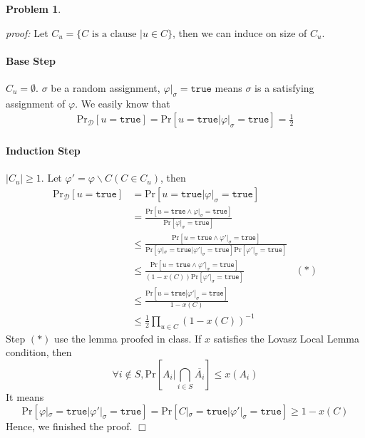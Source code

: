 \documentclass{article}
\newtheorem{problem}[theorem]{Problem}
\newenvironment{solution}{\noindent \textit{proof:}}{$\Box$}
\begin{document}
\begin{problem}
\end{problem}
\begin{solution}
    Let $C_u = \{ C \text{ is a clause } | u \in C \}$, then we can induce on size of $C_u$.
    \paragraph{Base Step} $C_u = \emptyset$. 
    $\sigma$ be a random assignment, 
    $\varphi|_\sigma = \mathtt{true}$ means $\sigma$ is a satisfying assignment of $\varphi$. We easily know that
    \begin{align*}
        \mathrm{Pr}_{\mathcal{D}}[u = \mathtt{true}] 
        = \mathrm{Pr}[u = \mathtt{true}|\varphi|_\sigma = \mathtt{true}] = \frac 1 2
    \end{align*}
    
    \paragraph{Induction Step} $|C_u| \geq 1$. Let $\varphi' = \varphi \backslash C(C \in C_u)$, then
    \begin{align*}
        \mathrm{Pr}_{\mathcal{D}}[u = \mathtt{true}] 
        &= \mathrm{Pr}[u = \mathtt{true}|\varphi|_\sigma = \mathtt{true}] \\
        &= \frac {\mathrm{Pr}[u = \mathtt{true} \land \varphi|_\sigma = \mathtt{true}]} {\mathrm{Pr}[\varphi|_\sigma = \mathtt{true}]} \\
        &\leq \frac {\mathrm{Pr}[u = \mathtt{true} \land \varphi'|_\sigma = \mathtt{true}]} {\mathrm{Pr}[\varphi|_\sigma = \mathtt{true}|\varphi'|_\sigma = \mathtt{true}]\mathrm{Pr}[\varphi'|_\sigma = \mathtt{true}]} \\
        &\leq \frac {\mathrm{Pr}[u = \mathtt{true} \land \varphi'|_\sigma = \mathtt{true}]} {(1-x(C))\mathrm{Pr}[\varphi'|_\sigma = \mathtt{true}]} &(*)\\
        &\leq \frac {\mathrm{Pr}[u = \mathtt{true} | \varphi'|_\sigma = \mathtt{true}]} {1-x(C)} \\
        &\leq \frac 1 2 \prod_{u\in C}(1-x(C))^{-1}
    \end{align*}
    Step $(*)$ use the lemma proofed in class. If $x$ satisfies the 
    Lovasz Local Lemma condition, then 
    $$
    \forall i \not\in S, \mathrm{Pr}[A_i|\bigcap_{i\in S}\overline{A_i}] \leq x(A_i)
    $$
    It means 
    $$\mathrm{Pr}[\varphi|_\sigma = \mathtt{true}|\varphi'|_\sigma = \mathtt{true}] = \mathrm{Pr}[C|_{\sigma}=\mathtt{true}|\varphi'|_\sigma = \mathtt{true}]\geq 1-x(C)
    $$
    Hence, we finished the proof.
\end{solution}
\end{document}
